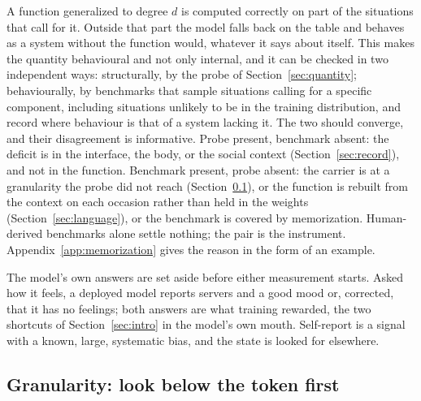 A function generalized to degree $d$ is computed correctly on part of the situations that call for it.
Outside that part the model falls back on the table and behaves as a system without the function
would, whatever it says about itself. This makes the quantity behavioural and not only internal, and it
can be checked in two independent ways: structurally, by the probe of Section~\ref{sec:quantity};
behaviourally, by benchmarks that sample situations calling for a specific component, including
situations unlikely to be in the training distribution, and record where behaviour is that of a system
lacking it. The two should converge, and their disagreement is informative. Probe present, benchmark
absent: the deficit is in the interface, the body, or the social context (Section~\ref{sec:record}),
and not in the function. Benchmark present, probe absent: the carrier is at a granularity the probe did
not reach (Section~\ref{sec:granularity}), or the function is rebuilt from the context on each occasion
rather than held in the weights (Section~\ref{sec:language}), or the benchmark is covered by
memorization. Human-derived benchmarks alone settle nothing; the pair is the instrument.
Appendix~\ref{app:memorization} gives the reason in the form of an example.

The model's own answers are set aside before either measurement starts. Asked how it feels, a deployed
model reports servers and a good mood or, corrected, that it has no feelings; both answers are what
training rewarded, the two shortcuts of Section~\ref{sec:intro} in the model's own mouth. Self-report is
a signal with a known, large, systematic bias, and the state is looked for elsewhere.

\subsection{Granularity: look below the token first}
\label{sec:granularity}

